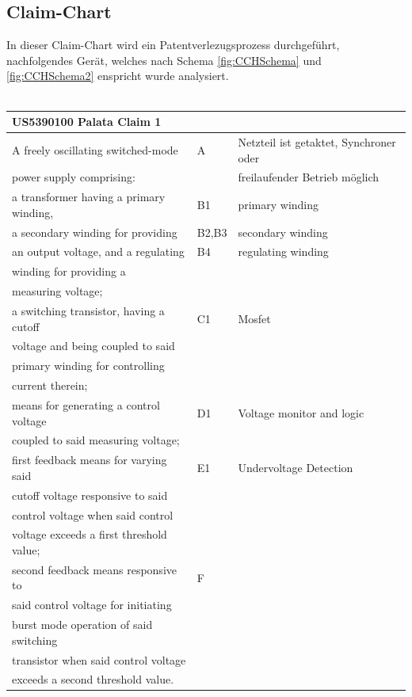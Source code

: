 \subsection{Claim-Chart}\label{sec:Claim-Chart}
In dieser Claim-Chart wird ein Patentverlezugsprozess durchgeführt, nachfolgendes Gerät, welches nach Schema \ref{fig:CCHSchema} und \ref{fig:CCHSchema2} enspricht wurde analysiert.\\
\\

\begin{tabular}{|l|l|l|}
	\hline 
\textbf{US5390100 Palata Claim 1}& &    \\ 
	\hline 
 A freely oscillating switched-mode &A & Netzteil ist getaktet, Synchroner oder\\
 power supply comprising:	&  &freilaufender Betrieb möglich  \\ 
	\hline 
a transformer having a primary winding,& B1 &primary winding\\
a secondary winding for providing &B2,B3 &secondary winding\\ 
an output voltage, and a regulating& B4&regulating winding\\
winding for providing a& & \\
measuring voltage; & &	 \\
	\hline 
a switching transistor, having a cutoff& C1 & Mosfet \\
voltage and being coupled to said  &  & \\
primary winding for controlling & & \\
current therein;	&  &  \\ 
	\hline 
means for generating a control voltage& D1 & Voltage monitor and logic\\
coupled to said measuring voltage;	&  &  \\ 
	\hline 
first feedback means for varying said & E1 &Undervoltage Detection\\
cutoff voltage responsive to said  &  &\\
control voltage when said control & &\\
voltage exceeds a first threshold value;  & &\\ 
	\hline 
second feedback means responsive to& F&\\
said control voltage for initiating  &  &\\
burst mode operation of said switching& & \\
transistor when said control voltage & &\\
exceeds a second threshold value.	&  &  \\ 
	\hline 

\end{tabular} 

